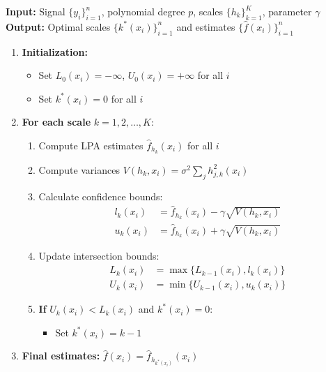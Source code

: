 \documentclass[12pt]{article}
\begin{document}
\begin{algorithm}
    \label{alg:ici}
    \textbf{Input:} Signal $\{y_i\}_{i=1}^n$, polynomial degree $p$, scales $\{h_k\}_{k=1}^K$, parameter $\gamma$ \\
    \textbf{Output:} Optimal scales $\{k^*(x_i)\}_{i=1}^n$ and estimates $\{\hat{f}(x_i)\}_{i=1}^n$

    \begin{enumerate}
        \item \textbf{Initialization:}
              \begin{itemize}
                  \item Set $L_0(x_i) = -\infty$, $U_0(x_i) = +\infty$ for all $i$
                  \item Set $k^*(x_i) = 0$ for all $i$
              \end{itemize}

        \item \textbf{For each scale} $k = 1, 2, \ldots, K$:
              \begin{enumerate}[label=(\alph*)]
                  \item Compute LPA estimates $\hat{f}_{h_k}(x_i)$ for all $i$
                  \item Compute variances $V(h_k, x_i) = \sigma^2 \sum_j h_{j,k}^2(x_i)$
                  \item Calculate confidence bounds:
                        \begin{align}
                            l_k(x_i) & = \hat{f}_{h_k}(x_i) - \gamma\sqrt{V(h_k, x_i)} \\
                            u_k(x_i) & = \hat{f}_{h_k}(x_i) + \gamma\sqrt{V(h_k, x_i)}
                        \end{align}
                  \item Update intersection bounds:
                        \begin{align}
                            L_k(x_i) & = \max\{L_{k-1}(x_i), l_k(x_i)\} \\
                            U_k(x_i) & = \min\{U_{k-1}(x_i), u_k(x_i)\}
                        \end{align}
                  \item \textbf{If} $U_k(x_i) < L_k(x_i)$ and $k^*(x_i) = 0$:
                        \begin{itemize}
                            \item Set $k^*(x_i) = k - 1$
                        \end{itemize}
              \end{enumerate}

        \item \textbf{Final estimates:} $\hat{f}(x_i) = \hat{f}_{h_{k^*(x_i)}}(x_i)$
    \end{enumerate}
\end{algorithm}
\end{document}
